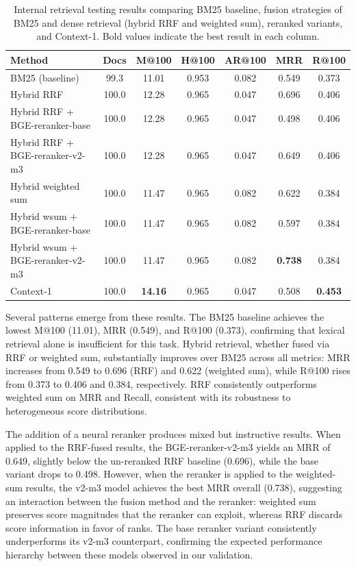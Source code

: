 \begin{table}[ht]
  \centering
  \caption{Internal retrieval testing results comparing BM25 baseline, fusion strategies of BM25 and dense retrieval (hybrid RRF and weighted sum), reranked variants, and Context-1. Bold values indicate the best result in each column.}
  \label{tab:internal-retrieval}
  \footnotesize
  \footnotesize
  \begin{tabular}{l|cccccc}
    \toprule
    \textbf{Method} & \textbf{Docs} & \textbf{M@100} & \textbf{H@100} & \textbf{AR@100} & \textbf{MRR} & \textbf{R@100} \\
    \midrule
    BM25 (baseline) & 99.3 & 11.01 & 0.953 & 0.082 & 0.549 & 0.373 \\
    \midrule
    Hybrid RRF & 100.0 & 12.28 & 0.965 & 0.047 & 0.696 & 0.406 \\
    Hybrid RRF + BGE-reranker-base & 100.0 & 12.28 & 0.965 & 0.047 & 0.498 & 0.406 \\
    Hybrid RRF + BGE-reranker-v2-m3 & 100.0 & 12.28 & 0.965 & 0.047 & 0.649 & 0.406 \\
    \midrule
    Hybrid weighted sum & 100.0 & 11.47 & 0.965 & 0.082 & 0.622 & 0.384 \\
    Hybrid wsum + BGE-reranker-base & 100.0 & 11.47 & 0.965 & 0.082 & 0.597 & 0.384 \\
    Hybrid wsum + BGE-reranker-v2-m3 & 100.0 & 11.47 & 0.965 & 0.082 & \textbf{0.738} & 0.384 \\
    \midrule
    Context-1 & 100.0 & \textbf{14.16} & 0.965 & 0.047 & 0.508 & \textbf{0.453} \\
    \bottomrule
  \end{tabular}
\end{table}

Several patterns emerge from these results. The BM25 baseline achieves the lowest M@100 (11.01), MRR (0.549), and R@100 (0.373), confirming that lexical retrieval alone is insufficient for this task. Hybrid retrieval, whether fused via RRF or weighted sum, substantially improves over BM25 across all metrics: MRR increases from 0.549 to 0.696 (RRF) and 0.622 (weighted sum), while R@100 rises from 0.373 to 0.406 and 0.384, respectively. RRF consistently outperforms weighted sum on MRR and Recall, consistent with its robustness to heterogeneous score distributions.

The addition of a neural reranker produces mixed but instructive results. When applied to the RRF-fused results, the BGE-reranker-v2-m3 yields an MRR of 0.649, slightly below the un-reranked RRF baseline (0.696), while the base variant drops to 0.498. However, when the reranker is applied to the weighted-sum results, the v2-m3 model achieves the best MRR overall (0.738), suggesting an interaction between the fusion method and the reranker: weighted sum preserves score magnitudes that the reranker can exploit, whereas RRF discards score information in favor of ranks. The base reranker variant consistently underperforms its v2-m3 counterpart, confirming the expected performance hierarchy between these models observed in our validation.

